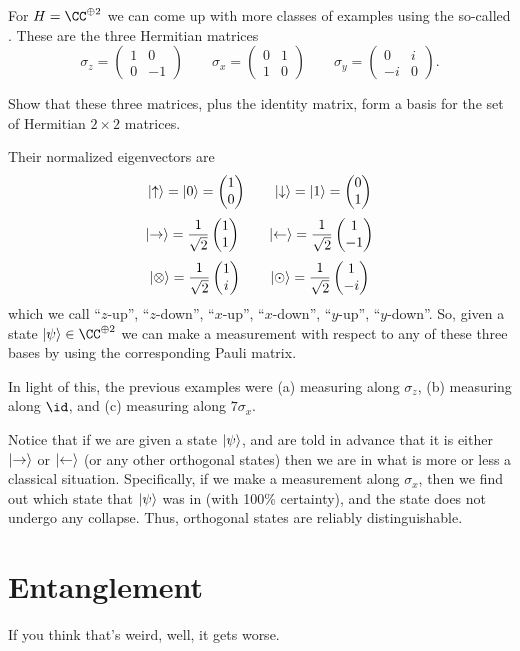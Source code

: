 \documentclass[11pt]{scrreprt}
\begin{document}
For $H = \CC^{\oplus 2}$ we can come up with more classes of examples using
the so-called .
These are the three Hermitian matrices
\[
	\sigma_z = \begin{pmatrix} 1 & 0 \\ 0 & -1 \end{pmatrix}
	\qquad
	\sigma_x = \begin{pmatrix} 0 & 1 \\ 1 & 0 \end{pmatrix}
	\qquad
	\sigma_y = \begin{pmatrix} 0 & i \\ -i & 0 \end{pmatrix}.
\]
\begin{ques}
	Show that these three matrices, plus the identity matrix,
	form a basis for the set of Hermitian $2 \times 2$ matrices.
\end{ques}
Their normalized eigenvectors are
\[ \ket\uparrow = \ket0 = \begin{pmatrix} 1 \\ 0 \end{pmatrix} \qquad \ket\downarrow = \ket1 = \begin{pmatrix} 0 \\ 1 \end{pmatrix} \]
\[ \ket\rightarrow = \frac{1}{\sqrt2}\begin{pmatrix} 1 \\ 1 \end{pmatrix}
	\qquad \ket\leftarrow = \frac{1}{\sqrt2}\begin{pmatrix} 1 \\ -1 \end{pmatrix} \]
\[ \ket\otimes = \frac{1}{\sqrt2}\begin{pmatrix} 1 \\ i \end{pmatrix}
	\qquad \ket\odot = \frac{1}{\sqrt2}\begin{pmatrix} 1 \\ -i \end{pmatrix} \]
which we call ``$z$-up'', ``$z$-down'',
``$x$-up'', ``$x$-down'', ``$y$-up'', ``$y$-down''.
So, given a state $\ket\psi \in \CC^{\oplus 2}$
we can make a measurement with respect to any of these three bases
by using the corresponding Pauli matrix.

In light of this, the previous examples were (a) measuring along $\sigma_z$,
(b) measuring along $\id$, and (c) measuring along $7\sigma_x$.

Notice that if we are given a state $\ket\psi$,
and are told in advance that it is either $\ket\rightarrow$ or $\ket\leftarrow$
(or any other orthogonal states)
then we are in what is more or less a classical situation.
Specifically, if we make a measurement along $\sigma_x$,
then we find out which state that $\ket\psi$ was in (with 100\% certainty),
and the state does not undergo any collapse.
Thus, orthogonal states are reliably distinguishable.

\section{Entanglement}
If you think that's weird, well, it gets worse.
\end{document}
